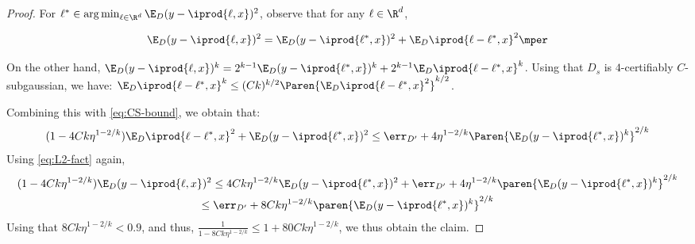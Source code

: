 \begin{proof}
{For $\ell^{*} \in \arg \min_{\ell \in \R^d} \E_D (y-\iprod{\ell,x})^2$, observe that for any $\ell \in \R^d$, 

\begin{equation}
\E_D(y-\iprod{\ell,x})^2 = \E_D (y-\iprod{\ell^{*},x})^2 + \E_D \iprod{\ell-\ell^{*},x}^2\mper \label{eq:L2-fact}
\end{equation}

On the other hand, $\E_D(y-\iprod{\ell,x})^k = 2^{k-1}\E_D (y-\iprod{\ell^{*},x})^k + 2^{k-1}\E_D \iprod{\ell-\ell^{*},x}^k$.
Using that $D_s$ is $4$-certifiably $C$-subgaussian, we have:
$\E_D \iprod{\ell-\ell^{*},x}^k \leq (Ck)^{k/2} \Paren{\E_D \iprod{\ell-\ell^{*},x}^2}^{k/2}$.

Combining this with \eqref{eq:CS-bound}, we obtain that:
\[
(1-4Ck \eta^{1-2/k}) \E_D \iprod{\ell-\ell^{*},x}^2 + \E_D (y-\iprod{\ell^{*},x})^2 \leq \err_{D'} + 4\eta^{1-2/k} \Paren{\E_D (y-\iprod{\ell^{*},x})^k}^{2/k}
\]
Using \eqref{eq:L2-fact} again,
\begin{multline}
(1-4Ck\eta^{1-2/k})\E_D (y-\iprod{\ell,x})^2 \leq 4Ck \eta^{1-2/k} \E_D (y-\iprod{\ell^{*},x})^2 +\err_{D'} + 4\eta^{1-2/k} \paren{\E_D (y-\iprod{\ell^{*},x})^k}^{2/k} \\\leq \err_{D'} + 8Ck\eta^{1-2/k} \paren{\E_D (y-\iprod{\ell^{*},x})^k}^{2/k}
\end{multline}
Using that $8Ck\eta^{1-2/k} <0.9$, and thus, $\frac{1}{1-8Ck\eta^{1-2/k}} \leq 1+ 80Ck\eta^{1-2/k}$, we thus obtain the claim. }








\end{proof}
